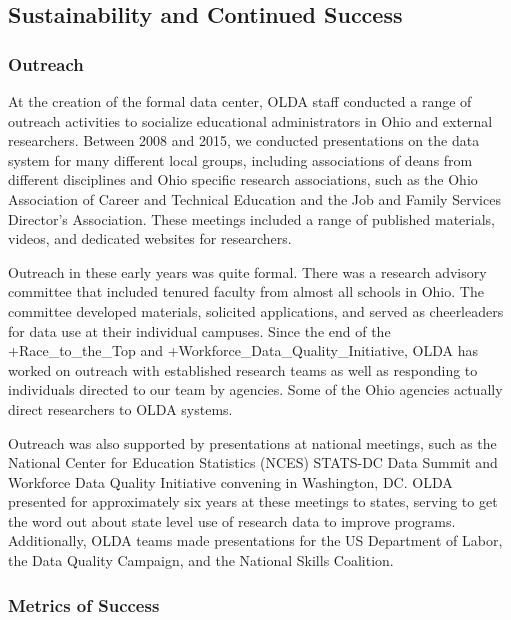 \documentclass[
]{WileySix}
\begin{document}
\hypertarget{sustainability-and-continued-success-1}{%
\subsection{Sustainability and Continued Success}\label{sustainability-and-continued-success-1}}

\hypertarget{outreach-1}{%
\subsubsection{Outreach}\label{outreach-1}}

At the creation of the formal data center, OLDA staff conducted a range of outreach activities to socialize educational administrators in Ohio and external researchers. Between 2008 and 2015, we conducted presentations on the data system for many different local groups, including associations of deans from different disciplines and Ohio specific research associations, such as the Ohio Association of Career and Technical Education and the Job and Family Services Director's Association. These meetings included a range of published materials, videos, and dedicated websites for researchers.

Outreach in these early years was quite formal. There was a research advisory committee that included tenured faculty from almost all schools in Ohio. The committee developed materials, solicited applications, and served as cheerleaders for data use at their individual campuses. Since the end of the +Race\_to\_the\_Top\textbar{} and +Workforce\_Data\_Quality\_Initiative\textbar, OLDA has worked on outreach with established research teams as well as responding to individuals directed to our team by agencies. Some of the Ohio agencies actually direct researchers to OLDA systems.

Outreach was also supported by presentations at national meetings, such as the National Center for Education Statistics (NCES) STATS-DC Data Summit and Workforce Data Quality Initiative convening in Washington, DC. OLDA presented for approximately six years at these meetings to states, serving to get the word out about state level use of research data to improve programs. Additionally, OLDA teams made presentations for the US Department of Labor, the Data Quality Campaign, and the National Skills Coalition.

\hypertarget{metrics-of-success-1}{%
\subsubsection{Metrics of Success}\label{metrics-of-success-1}}
\end{document}
